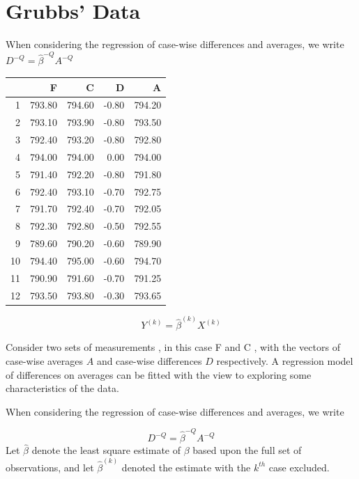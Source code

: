 \documentclass[12pt, a4paper]{report}
\theoremstyle{plain}
\theoremstyle{definition}
\theoremstyle{remark}
\begin{document}
	
	\section{Grubbs' Data} %
	
	When considering the regression of case-wise differences and averages, we write $D^{-Q} = \hat{\beta}^{-Q}A^{-Q}$
	
	
	
	
	\begin{table}[ht]
		\begin{center}
			\begin{tabular}{rrrrr}
				\hline
				& F & C & D & A \\
				\hline
				1 & 793.80 & 794.60 & -0.80 & 794.20 \\
				2 & 793.10 & 793.90 & -0.80 & 793.50 \\
				3 & 792.40 & 793.20 & -0.80 & 792.80 \\
				4 & 794.00 & 794.00 & 0.00 & 794.00 \\
				5 & 791.40 & 792.20 & -0.80 & 791.80 \\
				6 & 792.40 & 793.10 & -0.70 & 792.75 \\
				7 & 791.70 & 792.40 & -0.70 & 792.05 \\
				8 & 792.30 & 792.80 & -0.50 & 792.55 \\
				9 & 789.60 & 790.20 & -0.60 & 789.90 \\
				10 & 794.40 & 795.00 & -0.60 & 794.70 \\
				11 & 790.90 & 791.60 & -0.70 & 791.25 \\
				12 & 793.50 & 793.80 & -0.30 & 793.65 \\
				\hline
			\end{tabular}
		\end{center}
	\end{table}
	
	\begin{equation}
	Y^{(k)} = \hat{\beta}^{(k)}X^{(k)}
	\end{equation}
	
	Consider two sets of measurements , in this case F and C , with the vectors of case-wise averages $A$ and case-wise differences $D$ respectively. A regression model of differences on averages can be fitted with the view to exploring some characteristics of the data.
	
	When considering the regression of case-wise differences and averages, we write
	
	\begin{equation}
	D^{-Q} = \hat{\beta}^{-Q}A^{-Q}
	\end{equation}
	Let $\hat{\beta}$ denote the least square estimate of $\beta$ based upon the full set of observations, and let $\hat{\beta}^{(k)}$ denoted the estimate with the $k^{th}$ case excluded.
	
\end{document}
